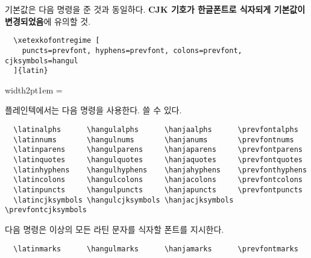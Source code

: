 \documentclass[a4paper]{article}
\newenvironment{plaintex}
  {\par\medskip\leavevmode\hbox\bgroup
    \color{white!80!black}\vrule width2pt\color{black}\kern1em
    \vbox\bgroup\hsize=\dimexpr\textwidth-12pt\relax
    \small
  }{\egroup\egroup\par\medskip}
\def\hemph#1{\textsf{\bfseries #1}}
\begin{document}
기본값은 다음 명령을 준 것과 동일하다. \hemph{CJK 기호가 한글폰트로 식자되게
기본값이 변경되었음}에 유의할 것.
\begin{verbatim}
  \xetexkofontregime [
    puncts=prevfont, hyphens=prevfont, colons=prevfont, cjksymbols=hangul
  ]{latin}
\end{verbatim}

\begin{plaintex}
플레인텍에서는 다음 명령을 사용한다.  쓸 수 있다.
\begin{verbatim}
  \latinalphs      \hangulalphs      \hanjaalphs      \prevfontalphs
  \latinnums       \hangulnums       \hanjanums       \prevfontnums
  \latinparens     \hangulparens     \hanjaparens     \prevfontparens
  \latinquotes     \hangulquotes     \hanjaquotes     \prevfontquotes
  \latinhyphens    \hangulhyphens    \hanjahyphens    \prevfonthyphens
  \latincolons     \hangulcolons     \hanjacolons     \prevfontcolons
  \latinpuncts     \hangulpuncts     \hanjapuncts     \prevfontpuncts
  \latincjksymbols \hangulcjksymbols \hanjacjksymbols \prevfontcjksymbols
\end{verbatim}
다음 명령은 이상의 모든 라틴 문자를 식자할 폰트를 지시한다.
\begin{verbatim}
  \latinmarks      \hangulmarks      \hanjamarks      \prevfontmarks
\end{verbatim}
\end{plaintex}
\end{document}
